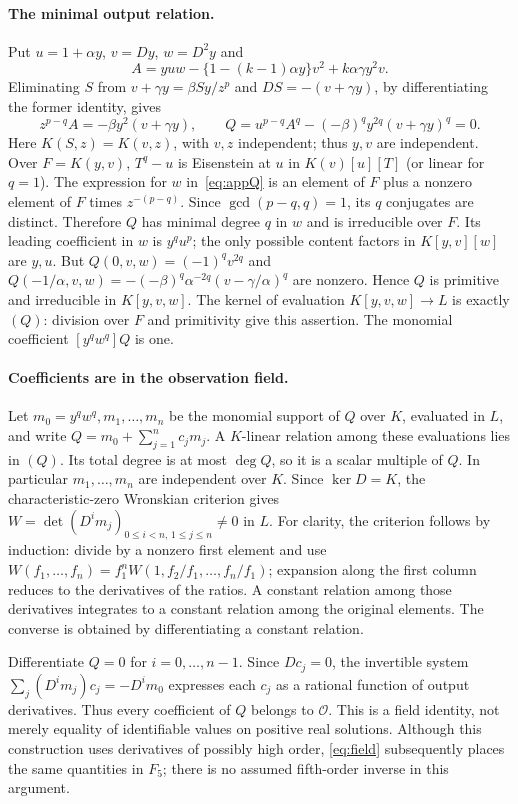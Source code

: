 \documentclass[10pt,a4paper]{article}
\begin{document}
\paragraph{The minimal output relation.}
Put $u=1+\alpha y$, $v=Dy$, $w=D^2y$ and
\[
A=yu w-\{1-(k-1)\alpha y\}v^2+k\alpha\gamma y^2v.
\]
Eliminating $S$ from $v+\gamma y=\beta Sy/z^p$ and
$DS=-(v+\gamma y)$, by differentiating the former identity, gives
\begin{equation}
z^{p-q}A=-\beta y^2(v+\gamma y),\qquad
Q=u^{p-q}A^q-(-\beta)^q y^{2q}(v+\gamma y)^q=0.
\label{eq:appQ}
\end{equation}
Here $K(S,z)=K(v,z)$, with $v,z$ independent; thus $y,v$ are
independent. Over $F=K(y,v)$, $T^q-u$ is Eisenstein at $u$
in $K(v)[u][T]$ (or linear for $q=1$).
The expression for $w$ in~\eqref{eq:appQ} is an element of $F$
plus a nonzero element of $F$ times $z^{-(p-q)}$.
Since $\gcd(p-q,q)=1$, its $q$ conjugates are distinct.
Therefore $Q$ has minimal degree $q$ in $w$ and is irreducible
over $F$. Its leading coefficient in $w$ is $y^q u^p$;
the only possible content factors in $K[y,v][w]$ are $y,u$.
But $Q(0,v,w)=(-1)^qv^{2q}$ and
$Q(-1/\alpha,v,w)=-(-\beta)^q\alpha^{-2q}(v-\gamma/\alpha)^q$
are nonzero. Hence $Q$ is primitive and irreducible in $K[y,v,w]$.
The kernel of evaluation $K[y,v,w]\to L$ is exactly $(Q)$:
division over $F$ and primitivity give this assertion.
The monomial coefficient $[y^qw^q]Q$ is one.

\paragraph{Coefficients are in the observation field.}
Let $m_0=y^qw^q,m_1,\ldots,m_n$ be the monomial support of $Q$
over $K$, evaluated in $L$, and write $Q=m_0+\sum_{j=1}^n c_jm_j$.
A $K$-linear relation among these evaluations lies in $(Q)$.
Its total degree is at most $\deg Q$, so it is a scalar multiple
of $Q$. In particular $m_1,\ldots,m_n$ are independent over $K$.
Since $\ker D=K$, the characteristic-zero Wronskian criterion gives
$W=\det(D^im_j)_{0\leq i<n,\,1\leq j\leq n}\ne0$ in $L$.
For clarity, the criterion follows by induction: divide by a nonzero
first element and use
$W(f_1,\ldots,f_n)=f_1^nW(1,f_2/f_1,\ldots,f_n/f_1)$;
expansion along the first column reduces to the derivatives of the
ratios. A constant relation among those derivatives integrates to
a constant relation among the original elements. The converse is
obtained by differentiating a constant relation.

Differentiate $Q=0$ for $i=0,\ldots,n-1$. Since $Dc_j=0$,
the invertible system
$\sum_j(D^im_j)c_j=-D^im_0$ expresses each $c_j$ as a rational
function of output derivatives. Thus every coefficient of $Q$
belongs to $\mathcal O$. This is a field identity, not merely
equality of identifiable values on positive real solutions.
Although this construction uses derivatives of possibly high order,
\eqref{eq:field} subsequently places the same quantities in $F_5$;
there is no assumed fifth-order inverse in this argument.
\end{document}
